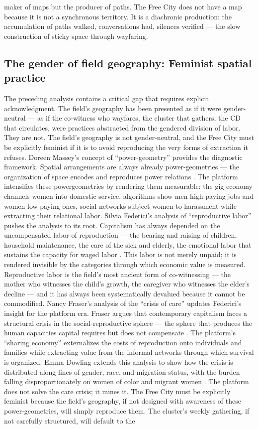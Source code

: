 maker of maps but the producer of paths. The Free City does not have a map because it is not a synchronous territory. It is a diachronic production: the accumulation of paths walked, conversations had, silences verified — the slow construction of sticky space through wayfaring.

\subsection{The gender of field geography: Feminist spatial practice}

The preceding analysis contains a critical gap that requires explicit acknowledgment. The field’s geography has been presented as if it were gender-neutral — as if the co-witness who wayfares, the cluster that gathers, the CD that circulates, were practices abstracted from the gendered division of labor. They are not. The field’s geography is not gender-neutral, and the Free City must be explicitly feminist if it is to avoid reproducing the very forms of extraction it refuses. Doreen Massey’s concept of “power-geometry” provides the diagnostic framework. Spatial arrangements are always already power-geometries — the organization of space encodes and reproduces power relations \cite[pp.~81--89]{massey_2005}. The platform intensifies these powergeometries by rendering them measurable: the gig economy channels women into domestic service, algorithms show men high-paying jobs and women low-paying ones, social networks subject women to harassment while extracting their relational labor. Silvia Federici’s analysis of “reproductive labor” pushes the analysis to its root. Capitalism has always depended on the uncompensated labor of reproduction — the bearing and raising of children, household maintenance, the care of the sick and elderly, the emotional labor that sustains the capacity for waged labor \cite[pp.~62--82]{federici_2004}. This labor is not merely unpaid; it is rendered invisible by the categories through which economic value is measured. Reproductive labor is the field’s most ancient form of co-witnessing — the mother who witnesses the child’s growth, the caregiver who witnesses the elder’s decline — and it has always been systematically devalued because it cannot be commodified. Nancy Fraser’s analysis of the “crisis of care” updates Federici’s insight for the platform era. Fraser argues that contemporary capitalism faces a structural crisis in the social-reproductive sphere — the sphere that produces the human capacities capital requires but does not compensate \cite{fraser_2016}. The platform’s “sharing economy” externalizes the costs of reproduction onto individuals and families while extracting value from the informal networks through which survival is organized. Emma Dowling extends this analysis to show how the crisis is distributed along lines of gender, race, and migration status, with the burden falling disproportionately on women of color and migrant women \cite{dowling_2021}. The platform does not solve the care crisis; it mines it. The Free City must be explicitly feminist because the field’s geography, if not designed with awareness of these power-geometries, will simply reproduce them. The cluster’s weekly gathering, if not carefully structured, will default to the 